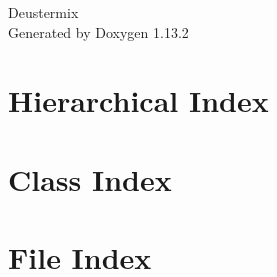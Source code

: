 \documentclass[twoside]{book}
\newcommand{\+}{\discretionary{\mbox{\scriptsize$\hookleftarrow$}}{}{}}
\newcommand{\clearemptydoublepage}{%
    \newpage{\pagestyle{empty}\cleardoublepage}%
  }
\begin{document}
  \raggedbottom
    \hypersetup{pageanchor=false,
                bookmarksnumbered=true,
                pdfencoding=unicode
               }
  \begin{titlepage}
  \vspace*{7cm}
  \begin{center}%
  {\Large Deustermix}\\
  \vspace*{1cm}
  {\large Generated by Doxygen 1.13.2}\\
  \end{center}
  \end{titlepage}
  \clearemptydoublepage
  \tableofcontents
  \clearemptydoublepage
  \hypersetup{pageanchor=true}

\chapter{Hierarchical Index}

\chapter{Class Index}

\chapter{File Index}

\end{document}
